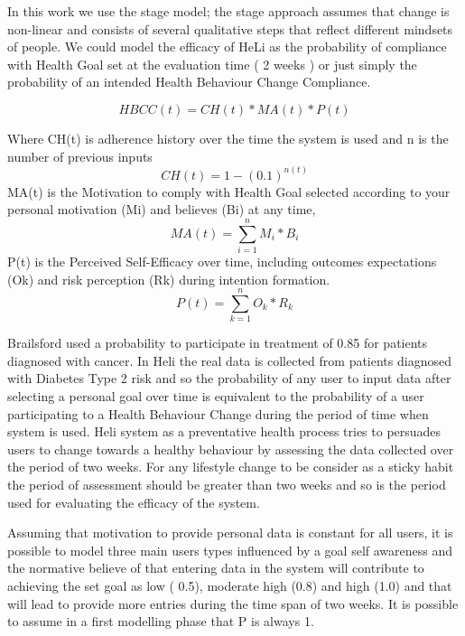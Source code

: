 \documentclass{llncs}
\begin{document}
In this work we use the stage model; the stage approach assumes that change is non-linear and consists of several qualitative steps that reflect different mindsets of people.
We could model the efficacy of HeLi as the probability of compliance with Health Goal set at the evaluation time ( 2 weeks ) or just simply the probability of an intended Health Behaviour Change Compliance.

\begin{equation}
 	HBCC(t) =  CH(t) * MA(t) * P(t)
\label{Eq.HBChange}
\end{equation}

Where CH(t) is adherence history over the time the system is used and n is the number of previous inputs
\begin{equation}
           CH(t) =   1 - (0.1)^ {n(t)} 
\label{Eq.ComplianceHistory}
\end{equation}
 MA(t) is the Motivation to comply with Health Goal selected according to your personal motivation (Mi) and believes (Bi) at any time,
 \begin{equation}
           MA(t) =  \sum_{i=1}^n M_i * B_i 
\label{Eq.MotivationHistory}
\end{equation}
  P(t) is the Perceived Self-Efficacy over time, including outcomes expectations (Ok) and risk perception (Rk)  during intention formation.
  \begin{equation}
           P(t) =  \sum_{k=1}^n O_k * R_k
\label{Eq.PerceivedSE}
\end{equation}

    Brailsford used a probability to participate in treatment of 0.85 \cite{Brailsford2016} for patients diagnosed with cancer.  In Heli the real data is collected from patients diagnosed with Diabetes Type 2 risk and so the probability of any user to input data after selecting a personal goal over time is equivalent to the probability of a user participating to a Health Behaviour Change during the period of time when system is used. Heli system as a preventative health process tries to persuades users to change towards a healthy behaviour by assessing the data collected over the period of two weeks. For any lifestyle change to be consider as a sticky habit the period of assessment should be greater  than two weeks and so is the period used for evaluating the efficacy of the system. 
    
   Assuming that motivation to provide personal data is constant for all users, it is possible to model three main users types influenced by a goal self awareness and the normative believe of that entering data in the system will contribute to achieving the set goal as low ( 0.5), moderate high (0.8) and high (1.0) and that will lead to provide more entries during the time span of two weeks. It is possible to assume in a first modelling phase that P is always 1.
   
\end{document}

